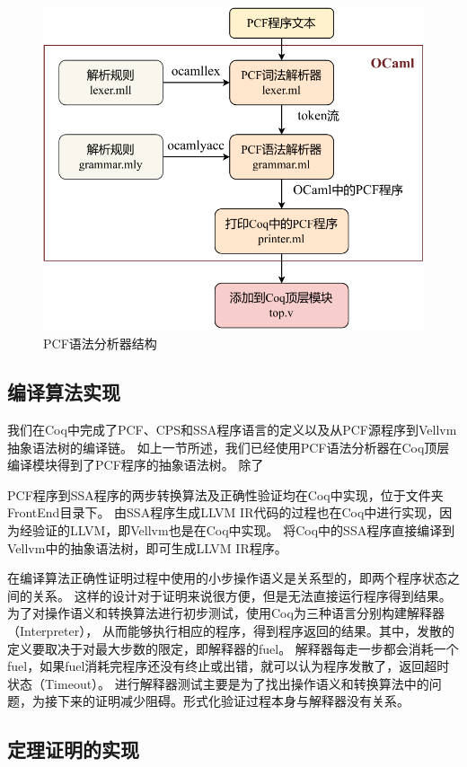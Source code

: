 \begin{figure}[htbp]
    \centering
    \includegraphics[width=0.8\linewidth]{figures/pcfparser.pdf}
    \caption{PCF语法分析器结构}\label{fig:parser}
\end{figure}

\subsection{编译算法实现}

我们在Coq中完成了PCF、CPS和SSA程序语言的定义以及从PCF源程序到Vellvm抽象语法树的编译链。
如上一节所述，我们已经使用PCF语法分析器在Coq顶层编译模块得到了PCF程序的抽象语法树。
除了

PCF程序到SSA程序的两步转换算法及正确性验证均在Coq中实现，位于文件夹FrontEnd目录下。
由SSA程序生成LLVM IR代码的过程也在Coq中进行实现，因为经验证的LLVM，即Vellvm也是在Coq中实现。
将Coq中的SSA程序直接编译到Vellvm中的抽象语法树，即可生成LLVM IR程序。

在编译算法正确性证明过程中使用的小步操作语义是关系型的，即两个程序状态之间的关系。
这样的设计对于证明来说很方便，但是无法直接运行程序得到结果。
为了对操作语义和转换算法进行初步测试，使用Coq为三种语言分别构建解释器（Interpreter），
从而能够执行相应的程序，得到程序返回的结果。其中，发散的定义要取决于对最大步数的限定，即解释器的fuel。
解释器每走一步都会消耗一个fuel，如果fuel消耗完程序还没有终止或出错，就可以认为程序发散了，返回超时状态（Timeout）。
进行解释器测试主要是为了找出操作语义和转换算法中的问题，为接下来的证明减少阻碍。形式化验证过程本身与解释器没有关系。

\subsection{定理证明的实现}

